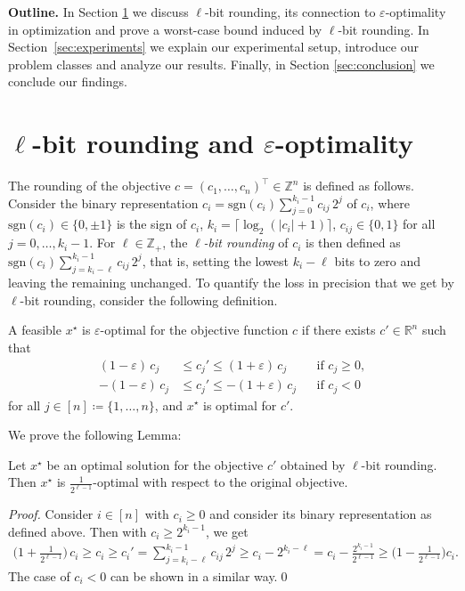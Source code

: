 \documentclass[runningheads]{llncs}
\newcommand{\ceil}[1]{\lceil #1 \rceil}
\newcommand{\abs}[1]{\lvert{#1}\rvert}
\newcommand{\Z}{\mathds{Z}}
\newcommand{\R}{\mathds{R}}
\newcommand{\define}{\coloneqq}
\newcommand{\T}{^\top}
\begin{document}
\noindent
\textbf{Outline.}
In Section \ref{sec:Basics} we discuss $\ell$-bit rounding, its connection to $\varepsilon$-optimality in optimization and prove a worst-case bound induced by $\ell$-bit rounding. In Section~\ref{sec:experiments} we explain our experimental setup, introduce our problem classes and analyze our results. Finally, in Section \ref{sec:conclusion} we conclude our findings.

\section{$\ell$-bit rounding and $\varepsilon$-optimality}
\label{sec:Basics}

The rounding of the objective $c = (c_1, \ldots, c_n)\T \in \Z^n$ is defined as follows.
Consider the binary representation $c_i = \text{sgn}(c_i) \sum_{j = 0}^{k_i-1} c_{ij}\, 2^j$ of $c_i$, where $\text{sgn}(c_i) \in \{0,\pm 1\}$ is the sign of $c_i$, $k_i = \ceil{\log_2(\abs{c_i} + 1)}$, $c_{ij} \in \{0,1\}$ for all $j = 0, \dots, k_i - 1$.
For $\ell \in \Z_+$, the \emph{$\ell$-bit rounding} of $c_i$ is then defined as $\text{sgn}(c_i) \sum_{j = k_i - \ell}^{k_i - 1} c_{ij}\, 2^j$, that is, setting the lowest $k_i - \ell$ bits to zero and leaving the remaining unchanged.
To quantify the loss in precision that we get by $\ell$-bit rounding, consider the following definition.

\begin{definition}\label{def:epsilon_optimal}
    A feasible $x^\star$ is $\varepsilon$-optimal for the objective function $c$ if there exists $c' \in \R^n$ such that
    \begin{align*}\label{eq:perturbed_optimality}
    (1-\varepsilon)\, c_j & \leq c_j' \leq (1+\varepsilon)\, c_j && \text{if } c_j \geq 0, \\
    -(1-\varepsilon)\, c_j & \leq c_j' \leq -(1+\varepsilon)\, c_j && \text{if } c_j < 0
    \end{align*}
    for all $j \in [n] \define \{1, \dots, n\}$, and $x^\star$ is optimal for $c'$.
\end{definition}
We prove the following Lemma$\colon$
\begin{lemma}\label{lemma:Approximation}
   Let $x^\star$ be an optimal solution for the objective $c'$ obtained by $\ell$-bit rounding. Then $x^\star$ is $\frac{1}{2^{\ell-1}}$-optimal with respect to the original objective.
\end{lemma}

\begin{proof}
    Consider $i \in [n]$ with $c_i \geq 0$ and consider its binary representation as defined above.
    Then with $c_i \geq 2^{k_i-1}$, we get
    \begin{align*}
    \big(1+ \tfrac{1}{2^{\ell-1}}\big)\, c_i \geq c_i \geq c_i' = \sum_{j = k_i - \ell}^{k_i - 1} c_{ij}\, 2^j \geq c_i - 2^{k_i-\ell} = c_i - \frac{2^{k_i-1}}{2^{\ell-1}} \geq \big(1- \tfrac{1}{2^{\ell-1}}\big) c_i.
    \end{align*}
    The case of $c_i < 0$ can be shown in a similar way.\qed
\end{proof}
\end{document}
